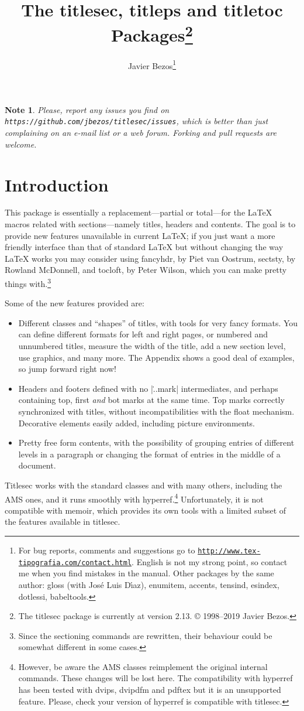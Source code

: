\documentclass[a4paper]{ltxguide}
\title{The \textsf{titlesec}, \textsf{titleps} and \textsf{titletoc} 
Packages\footnote{The \textsf{titlesec} package is currently at 
version 2.13. \copyright{} 1998--2019 Javier Bezos.}}
\author{Javier Bezos\footnote{For bug reports, comments and
suggestions go to \href{http://www.tex-tipografia.com/contact.html}%
{\texttt{http://www.tex-tipografia.com/contact.html}}.  English
is not my strong point, so contact me when you find mistakes in the
manual.  Other packages by the same author: \textsf{gloss} (with
Jos\'e Luis D\'{\i}az), \textsf{enumitem, accents, tensind, esindex,
dotlessi, babeltools}.}}
\date{\docdate}
\newtheorem{note}{Note}
\begin{document}
\maketitle
\tableofcontents

\begin{note}
  Please, report any issues you find on
  \texttt{https://github.com/jbezos/titlesec/issues}, which is better
  than just complaining on an e-mail list or a web forum. Forking
  and pull requests are welcome.
\end{note}

\section{Introduction}

This package is essentially a replacement---partial or total---for the 
\LaTeX{} macros related with sections---namely titles, headers and 
contents.  The goal is to provide new features unavailable in current 
\LaTeX{}; if you just want a more friendly interface than that of 
standard \LaTeX{} but without changing the way \LaTeX{} works you may 
consider using \textsf{fancyhdr}, by Piet van Oostrum, \textsf{sectsty},
by Rowland McDonnell, and \textsf{tocloft}, by Peter Wilson, which you
can make pretty things with.\footnote{Since the sectioning commands 
are rewritten, their behaviour could be somewhat different 
in some cases.}

Some of the new features provided are:
\begin{itemize}
\item Different classes and ``shapes'' of titles, with tools for very 
fancy formats.  You can define different formats for left and right 
pages, or numbered and unnumbered titles, measure the width of the 
title, add a new section level, use graphics, and many more.  The 
Appendix shows a good deal of examples, so jump forward right now!

\item Headers and footers defined with no |\...mark| intermediates,
and perhaps containing top, first \emph{and} bot marks at the same time.
Top marks correctly synchronized with titles, without 
incompatibilities with the float mechanism. Decorative elements easily
added, including picture environments.

\item Pretty free form contents, with the possibility of grouping 
entries of different levels in a paragraph or changing the format
of entries in the middle of a document.
\end{itemize}
\textsf{Titlesec} works with the standard classes and with many
others, including the AMS ones, and it runs smoothly with
\textsf{hyperref}.\footnote{However, be aware the AMS classes
reimplement the original internal commands.  These changes will be
lost here.  The compatibility with \textsf{hyperref} has been tested
with \textsf{dvips}, \textsf{dvipdfm} and \textsf{pdftex} but it is an
unsupported feature.  Please, check your version of
\textsf{hyperref} is compatible with \textsf{titlesec}.}
Unfortunately, it is not compatible with \textsf{memoir}, which
provides its own tools with a limited subset of the features available
in \textsf{titlesec}.
\end{document}
